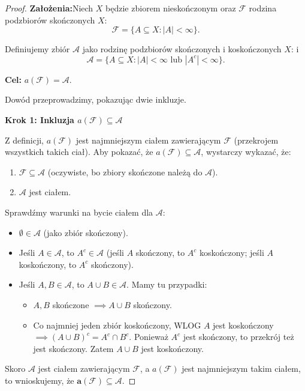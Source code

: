 \begin{proof}
\noindent \textbf{Założenia:}Niech $X$ będzie zbiorem nieskończonym oraz $\mathcal{F}$ rodzina podzbiorów skończonych $X$:
 \[
 \mathcal{F} = \{A\subseteq X: \left| A \right| < \infty\} 
 .\] 

 Definiujemy zbiór $\mathcal{A}$ jako rodzinę podzbiorów skończonych i koskończonych $X$: i
 \[
 \mathcal{A} = \{A \subseteq X: \left| A \right| <\infty \text{ lub } \left| A^{c} \right| < \infty\} 
 .\] 

\noindent \textbf{Cel:} $a\left( \mathcal{F} \right) = \mathcal{A}$.

Dowód przeprowadzimy, pokazując dwie inkluzje. 

\noindent \textbf{Krok 1: Inkluzja $a(\mathcal{F}) \subseteq \mathcal{A}$} 

Z definicji, $a(\mathcal{F})$ jest najmniejszym ciałem zawierającym $\mathcal{F}$ (przekrojem wszystkich takich ciał). Aby pokazać, że $a(\mathcal{F}) \subseteq \mathcal{A}$, wystarczy wykazać, że: 
\begin{enumerate} 
	\item $\mathcal{F} \subseteq \mathcal{A}$ (oczywiste, bo zbiory skończone należą do $\mathcal{A}$). 
	\item $\mathcal{A}$ jest ciałem.
\end{enumerate} 
Sprawdźmy warunki na bycie ciałem dla $\mathcal{A}$: 
\begin{itemize} 
	\item $\emptyset \in \mathcal{A}$ (jako zbiór skończony).
	\item Jeśli $A \in \mathcal{A}$, to $A^c \in \mathcal{A}$ (jeśli $A$ skończony, to $A^c$ koskończony; jeśli $A$ koskończony, to $A^c$ skończony). 
	\item Jeśli $A, B \in \mathcal{A}$, to $A \cup B \in \mathcal{A}$. Mamy tu przypadki: 
		\begin{itemize} 
			\item $A, B$ skończone $\implies A \cup B$ skończony. 
			\item Co najmniej jeden zbiór koskończony, WLOG $A$ jest koskończony $\implies (A \cup B)^c = A^c \cap B^c$. Ponieważ $A^c$ jest skończony, to przekrój też jest skończony. Zatem $A \cup B$ jest koskończony. 
		\end{itemize} 
\end{itemize} 
Skoro $\mathcal{A}$ jest ciałem zawierającym $\mathcal{F}$, a $a(\mathcal{F})$ jest najmniejszym takim ciałem, to wnioskujemy, że $\bm{a(\mathcal{F}) \subseteq \mathcal{A}}$. 


\end{proof}
